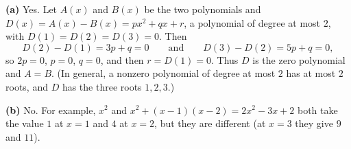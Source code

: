 \textbf{(a)} Yes. Let $A(x)$ and $B(x)$ be the two polynomials and $D(x)=A(x)-B(x)=px^2+qx+r$, a polynomial of degree at most $2$, with $D(1)=D(2)=D(3)=0$. Then
\[D(2)-D(1)=3p+q=0\qquad\text{and}\qquad D(3)-D(2)=5p+q=0,\]
so $2p=0$, $p=0$, $q=0$, and then $r=D(1)=0$. Thus $D$ is the zero polynomial and $A=B$. (In general, a nonzero polynomial of degree at most $2$ has at most $2$ roots, and $D$ has the three roots $1,2,3$.)

\textbf{(b)} No. For example, $x^2$ and $x^2+(x-1)(x-2)=2x^2-3x+2$ both take the value $1$ at $x=1$ and $4$ at $x=2$, but they are different (at $x=3$ they give $9$ and $11$).

